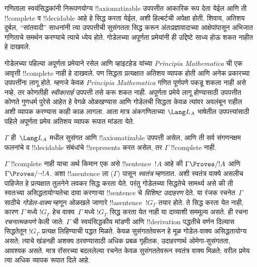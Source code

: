 \documentclass[../../../include/open-logic-section]{subfiles}
\begin{document}


गणिताला स्वयंसिद्धकांनी निरूपणयोग्य !!{axiomatizable} उपपत्तीत
आकारिक रूप देता येईल आणि ती !!{complete} व !!{decidable} आहे हे
सिद्ध करता येईल, अशी हिल्बर्टची अपेक्षा होती. शिवाय, अतिशय दुर्बल,
``सांतवादी'' साधनांनी त्या उपपत्तीची सुसंगतता सिद्ध करून
अंतःप्रज्ञावादाच्या आक्षेपांपासून अभिजात गणिताचे समर्थन करण्याचे
त्याचे ध्येय होते. गोडेलच्या अपूर्णता प्रमेयांनी ही उद्दिष्टे
साध्य होऊ शकत नाहीत हे दाखवले.

गोडेलच्या पहिल्या अपूर्णता प्रमेयाने रसेल आणि व्हाइटहेड यांच्या
\emph{Principia Mathematica} ची एक आवृत्ती !!{complete} नाही हे
दाखवले. पण सिद्धता प्रत्यक्षात अतिशय व्यापक होती आणि अनेक प्रकारच्या
उपपत्तींना लागू होते. म्हणजे केवळ \emph{Principia Mathematica}
गणित पूर्णपणे पकडू शकला नाही असे नव्हे, तर कोणतीही \emph{स्वीकारार्ह}
उपपत्ती तसे करू शकत नाही. अपूर्णता प्रमेये लागू होण्यासाठी उपपत्तीत
कोणते गुणधर्म पुरेसे आहेत हे वेगळे ओळखण्यास आणि गोडेलची सिद्धता
केवळ त्यांवर अवलंबून राहील अशी व्यापक करण्यास काही काळ लागला.
आता मात्र अंकगणिताच्या $\Lang L_A$ भाषेतील उपपत्त्यांसाठी पहिले
अपूर्णता प्रमेय अतिशय व्यापक रूपात मांडता येते.

\begin{thm}
$\Gamma$ ही~$\Lang
L_A$ मधील सुसंगत आणि !!{axiomatizable} उपपत्ती असेल, आणि ती सर्व
संगणनक्षम फलनांचे व !!{decidable} संबंधांचे !!{represents} करत असेल,
तर $\Gamma$ !!{complete} नाही.
\end{thm}

$\Gamma$ !!{complete} नाही याचा अर्थ किमान एक असे
!!{sentence}~$!A$ आहे की $\Gamma \Proves/ !A$ आणि
$\Gamma \Proves/ \lnot
!A$. अशा !!a{sentence} ला ($\Gamma)$ पासून \emph{स्वतंत्र}
म्हणतात. अशी स्वतंत्र वाक्ये असलीच पाहिजेत हे प्रत्यक्षात तुलनेने
लवकर सिद्ध करता येते. परंतु गोडेलच्या सिद्धतेचे सामर्थ्य असे की
ती स्वतःच्या असिद्धतायोग्यतेचा दावा करणाऱ्या !!{sentence} चे
\emph{विशिष्ट उदाहरण} देते.
या रंजक रचनेत~$\Gamma$ साठीचे \emph{गोडेल-वाक्य} म्हणून ओळखले
जाणारे !!a{sentence}~$!G_\Gamma$ तयार होते. ते सिद्ध करता येत
नाही, कारण $\Gamma$ मध्ये $!G_\Gamma$ हेच वाक्य~$\Gamma$ मध्ये
$!G_\Gamma$ सिद्ध करता येत नाही या दाव्याशी सममूल्य असते.
ही रचना \emph{रचनात्मकपणे} केली जाते: $\Gamma$ ची स्वयंसिद्धकीय
मांडणी आणि !!{derivation} पद्धतीचे वर्णन दिल्यास सिद्धतेतून
$!G_\Gamma$ प्रत्यक्ष लिहिण्याची पद्धत मिळते. केवळ सुसंगततेवरून हे मूळ गोडेल-वाक्य
असिद्धतायोग्य असते; त्याचे खंडनही अशक्य ठरवण्यासाठी अधिक प्रबळ
गृहीतक, उदाहरणार्थ ओमेगा-सुसंगतता, आवश्यक असते. मात्र रॉसरच्या
बदललेल्या रचनेत केवळ सुसंगततेवरून स्वतंत्र वाक्य मिळते; वरील
प्रमेय त्या अधिक व्यापक रूपात दिले आहे.
\end{document}
